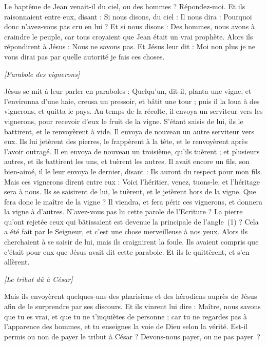 \begin{multicols}{2}
Le baptême de Jean venait-il du ciel, ou des hommes ? Répondez-moi.
Et ils raisonnaient entre eux, disant : Si nous disons, du ciel : Il nous dira : Pourquoi donc n’avez-vous pas cru en lui ?
Et si nous disons : Des hommes, nous avons à craindre le peuple, car tous croyaient que Jean était un vrai prophète.
Alors ils répondirent à Jésus : Nous ne savons pas. Et Jésus leur dit : Moi non plus je ne vous dirai pas par quelle autorité je fais ces choses.
\begin{center}
\textit{[Parabole des vignerons]}
\end{center}
\VerseOne{}Jésus se mit à leur parler en paraboles : Quelqu'un, dit-il, planta une vigne, et l'environna d'une haie, creusa un pressoir, et bâtit une tour ; puis il la loua à des vignerons, et quitta le pays.
Au temps de la récolte, il envoya un serviteur vers les vignerons, pour recevoir d'eux le fruit de la vigne.
S’étant saisis de lui, ils le battirent, et le renvoyèrent à vide.
Il envoya de nouveau un autre serviteur vers eux. Ils lui jetèrent des pierres, le frappèrent à la tête, et le renvoyèrent après l'avoir outragé.
Il en envoya de nouveau un troisième, qu’ils tuèrent ; et plusieurs autres, et ils battirent les uns, et tuèrent les autres.
Il avait encore un fils, son bien-aimé, il le leur envoya le dernier, disant : Ils auront du respect pour mon fils.
Mais ces vignerons dirent entre eux : Voici l'héritier, venez, tuons-le, et l'héritage sera à nous.
Ils se saisirent de lui, le tuèrent, et le jetèrent hors de la vigne.
Que fera donc le maître de la vigne ? Il viendra, et fera périr ces vignerons, et donnera la vigne à d'autres.
N'avez-vous pas lu cette parole de l’Ecriture ? La pierre qu’ont rejetée ceux qui bâtissaient est devenue la principale de l’angle (1) ?
Cela a été fait par le Seigneur, et c'est une chose merveilleuse à nos yeux.
Alors ils cherchaient à se saisir de lui, mais ils craignirent la foule. Ils avaient compris que c’était pour eux que Jésus avait dit cette parabole. Et ils le quittèrent, et s’en allèrent.
\begin{center}
\textit{[Le tribut dû à César]}
\end{center}
\PPE{}
Mais ils envoyèrent quelques-uns des pharisiens et des hérodiens auprès de Jésus afin de le surprendre par ses discours.
Et ils vinrent lui dire : Maître, nous savons que tu es vrai, et que tu ne t’inquiètes de personne ; car tu ne regardes pas à l'apparence des hommes, et tu enseignes la voie de Dieu selon la vérité. Est-il permis ou non de payer le tribut à César ? Devons-nous payer, ou ne pas payer ?

\end{multicols}
